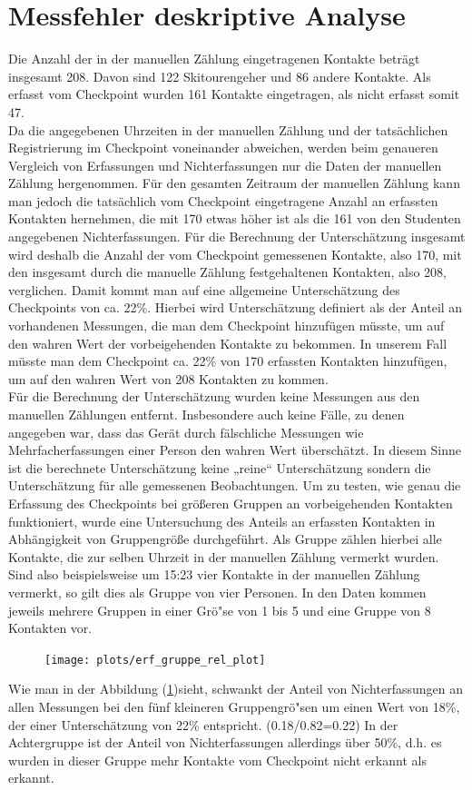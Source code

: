 \documentclass[12pt]{scrreprt}
\begin{document}
\section{Messfehler deskriptive Analyse}
Die Anzahl der in der manuellen Zählung eingetragenen Kontakte beträgt insgesamt 208. Davon sind 122 Skitourengeher und 86 andere Kontakte. Als erfasst vom Checkpoint wurden 161 Kontakte eingetragen, als nicht erfasst somit 47. \\
Da die angegebenen Uhrzeiten in der manuellen Zählung und der tatsächlichen Registrierung im Checkpoint voneinander abweichen, werden beim genaueren Vergleich von Erfassungen und Nichterfassungen nur die Daten der manuellen Zählung hergenommen. Für den gesamten Zeitraum der manuellen Zählung kann man jedoch die tatsächlich vom Checkpoint eingetragene Anzahl an erfassten Kontakten hernehmen, die mit 170 etwas höher ist als die 161 von den Studenten angegebenen Nichterfassungen. Für die Berechnung der Unterschätzung insgesamt wird deshalb die Anzahl der vom Checkpoint gemessenen Kontakte, also 170, mit den insgesamt durch die manuelle Zählung festgehaltenen Kontakten, also 208, verglichen. Damit kommt man auf eine allgemeine Unterschätzung des Checkpoints von ca. 22\%. Hierbei wird \glqq Unterschätzung \grqq definiert als der Anteil an vorhandenen Messungen, die man dem Checkpoint hinzufügen müsste, um auf den wahren Wert der vorbeigehenden Kontakte zu bekommen. In unserem Fall müsste man dem Checkpoint ca. 22\% von 170 erfassten Kontakten hinzufügen, um auf den wahren Wert von 208 Kontakten zu kommen. \\
Für die Berechnung der Unterschätzung wurden keine Messungen aus den manuellen Zählungen entfernt. Insbesondere auch keine Fälle, zu denen angegeben war, dass das Gerät durch fälschliche Messungen wie Mehrfacherfassungen einer Person den wahren Wert überschätzt. In diesem Sinne ist die berechnete Unterschätzung keine „reine“ Unterschätzung sondern die Unterschätzung für alle gemessenen Beobachtungen.
Um zu testen, wie genau die Erfassung des Checkpoints bei größeren Gruppen an vorbeigehenden Kontakten funktioniert, wurde eine Untersuchung des Anteils an erfassten Kontakten in Abhängigkeit von Gruppengröße durchgeführt. Als Gruppe zählen hierbei alle Kontakte, die zur selben Uhrzeit in der manuellen Zählung vermerkt wurden. Sind also beispielsweise um 15:23 vier Kontakte in der manuellen Zählung vermerkt, so gilt dies als Gruppe von vier Personen. In den Daten kommen jeweils mehrere Gruppen in einer Grö"se von 1 bis 5 und eine Gruppe von 8 Kontakten vor. \\
\begin{figure}[H]
	\centering
	\texttt{[image: plots/erf\_gruppe\_rel\_plot]}
	\caption{ }
	\label{pic:erf_gruppe_rel_plot}	
\end{figure}
\noindent Wie man in der Abbildung (\ref{pic:erf_gruppe_rel_plot})sieht, schwankt der Anteil von Nichterfassungen an allen Messungen bei den fünf kleineren Gruppengrö"sen um einen Wert von 18\%, der einer Unterschätzung von 22\% entspricht. (0.18/0.82=0.22) In der Achtergruppe ist der Anteil von Nichterfassungen allerdings über 50\%, d.h. es wurden in dieser Gruppe mehr Kontakte vom Checkpoint nicht erkannt als erkannt.
\end{document}
